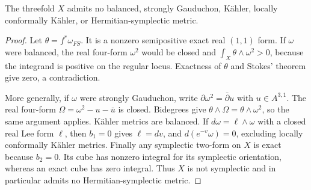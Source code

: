 \begin{proposition}\label{inv:C3.5}
The threefold $X$ admits no balanced, strongly Gauduchon, K\"ahler,
locally conformally K\"ahler, or Hermitian-symplectic metric.
\end{proposition}
\begin{proof}
Let $\theta=f^*\omega_{FS}$.  It is a nonzero semipositive exact
real $(1,1)$ form.  If $\omega$ were balanced, the real four-form
$\omega^2$ would be closed and
$\int_X\theta\wedge\omega^2>0$, because the integrand is positive
on the regular locus.  Exactness of $\theta$ and Stokes' theorem
give zero, a contradiction.

More generally, if $\omega$ were strongly Gauduchon, write
$\partial\omega^2=\bar\partial u$ with $u\in A^{3,1}$.
The real four-form $\Omega=\omega^2-u-\bar u$ is closed.
Bidegrees give $\theta\wedge\Omega=\theta\wedge\omega^2$,
so the same argument applies.  K\"ahler metrics are balanced.
If $d\omega=\ell\wedge\omega$ with a closed real Lee form
$\ell$, then $b_1=0$ gives $\ell=dv$, and
$d(e^{-v}\omega)=0$, excluding locally conformally K\"ahler metrics.
Finally any symplectic two-form on $X$ is exact because $b_2=0$.
Its cube has nonzero integral for its symplectic orientation, whereas
an exact cube has zero integral.  Thus $X$ is not symplectic and in
particular admits no Hermitian-symplectic metric.
\end{proof}

